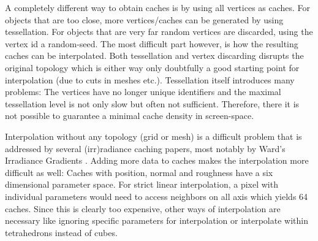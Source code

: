 \documentclass[thesis.tex]{subfiles}
\begin{document}
A completely different way to obtain caches is by using all vertices as caches.
For objects that are too close, more vertices/caches can be generated by using tessellation.
For objects that are very far random vertices are discarded, using the vertex id a random-seed.
The most difficult part however, is how the resulting caches can be interpolated.
Both tessellation and vertex discarding disrupts the original topology which is either way only doubtfully a good starting point for interpolation (due to cuts in meshes etc.).
Tessellation itself introduces many problems:
The vertices have no longer unique identifiers and the maximal tessellation level is not only slow but often not sufficient.
Therefore, there it is not possible to guarantee a minimal cache density in screen-space.

Interpolation without any topology (grid or mesh) is a difficult problem that is addressed by several (irr)radiance caching papers, most notably by Ward's Irradiance Gradients \cite{bib:irradiancecachegradients}.
Adding more data to caches makes the interpolation more difficult as well:
Caches with position, normal and roughness have a six dimensional parameter space. 
For strict linear interpolation, a pixel with individual parameters would need to access neighbors on all axis which yields 64 caches.
Since this is clearly too expensive, other ways of interpolation are necessary like ignoring specific parameters for interpolation or interpolate within tetrahedrons instead of cubes.


\subfilebib %
\end{document}
